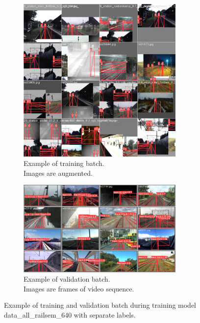 \documentclass[Master,MDS,english]{BASE/twbook} %
\begin{document}
\begin{figure}
\centering
\begin{subfigure}[t]{.5\textwidth}
  \centering
  \includegraphics[width=0.9\textwidth]{images/yolo/all_nl/train_batch2}
  \caption{Example of training batch.\\ Images are augmented.}
    \label{fig:mosaic_augmentation_highres_all}
\end{subfigure}%
\begin{subfigure}[t]{.5\textwidth}
  \centering
  \includegraphics[width=0.9\textwidth]{images/yolo/all_nl/val_batch2_pred}
  \caption{Example of validation batch.\\ Images are frames of video sequence.}
  \label{fig:mosaic_2}
\end{subfigure}
\caption{Example of training and validation batch during training model data\_all\_railsem\_640 with separate labels.}
\label{fig:yolo_all_example_nl}
\end{figure}
\end{document}
